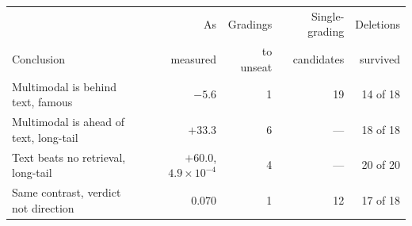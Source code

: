 \begin{tabular}{lrrrr}
\toprule
 & As & Gradings & Single-grading & Deletions \\
Conclusion & measured & to unseat & candidates & survived \\
\midrule
Multimodal is behind text, famous & $-5.6$ & 1 & 19 & 14 of 18 \\
Multimodal is ahead of text, long-tail & $+33.3$ & 6 & --- & 18 of 18 \\
Text beats no retrieval, long-tail & $+60.0$, $4.9 \times 10^{-4}$ & 4 & --- & 20 of 20 \\
\midrule
Same contrast, verdict not direction & 0.070 & 1 & 12 & 17 of 18 \\
\bottomrule
\end{tabular}
